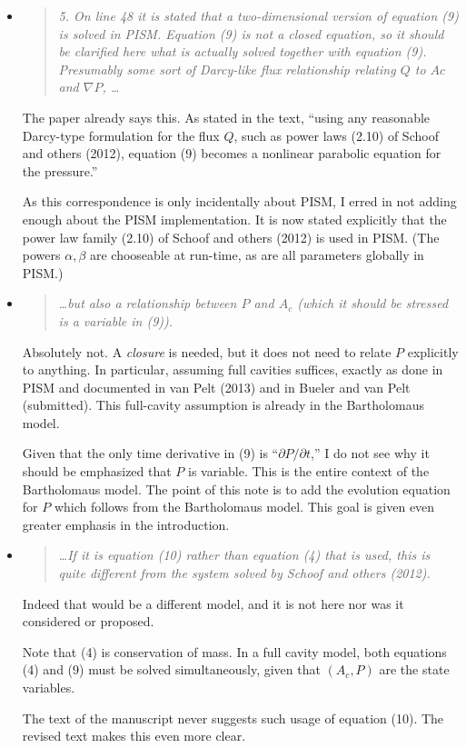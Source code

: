 \documentclass[11pt,reqno]{amsart}
\newcommand{\reply}[2]{
\medskip\medskip
\item  \begin{quote}
\emph{#1}
\end{quote}

\medskip
\noindent #2}
\begin{document}
\begin{itemize}
\reply{5. On line 48 it is stated that a two-dimensional version of equation (9) is solved in PISM.  Equation (9) is not a closed equation, so it should be clarified here what is actually solved  together with equation (9).  Presumably some sort of Darcy-like flux relationship relating $Q$ to $A c$ and $\nabla P$, \dots}
{The paper already says this.  As stated in the text, ``using any reasonable Darcy-type formulation for the flux $Q$, such as power laws (2.10) of Schoof and others (2012), equation (9) becomes a nonlinear parabolic equation for the pressure.''

As this correspondence is only incidentally about PISM, I erred in not adding enough about the PISM implementation.  It is now stated explicitly that the power law family (2.10) of Schoof and others (2012) is used in PISM.  (The powers $\alpha,\beta$ are chooseable at run-time, as are all parameters globally in PISM.)}

\reply{\dots but also a relationship between $P$ and $A_c$ (which it should be stressed is a variable in (9)).}
{Absolutely not.  A \emph{closure} is needed, but it does not need to relate $P$ explicitly to anything.  In particular, assuming full cavities suffices, exactly as done in PISM and documented in van Pelt (2013) and in Bueler and van Pelt (submitted).  This full-cavity assumption is already in the Bartholomaus model.

Given that the only time derivative in (9) is ``$\partial P/\partial t$,'' I do not see why it should be emphasized that $P$ is variable.  This is the entire context of the Bartholomaus model.  The point of this note is to add the evolution equation for $P$ which follows from the Bartholomaus model.  This goal is given even greater emphasis in the introduction.}

\reply{\dots  If it is equation (10) rather than equation (4) that is used, this is quite different from the system solved by Schoof and others (2012).}
{Indeed that would be a different model, and it is not here nor was it considered or proposed.

Note that (4) is conservation of mass.  In a full cavity model, both equations (4) and (9) must be solved simultaneously, given that $(A_c,P)$ are the state variables.

The text of the manuscript never suggests such usage of equation (10).  The revised text makes this even more clear.}


\end{itemize}
\end{document}
